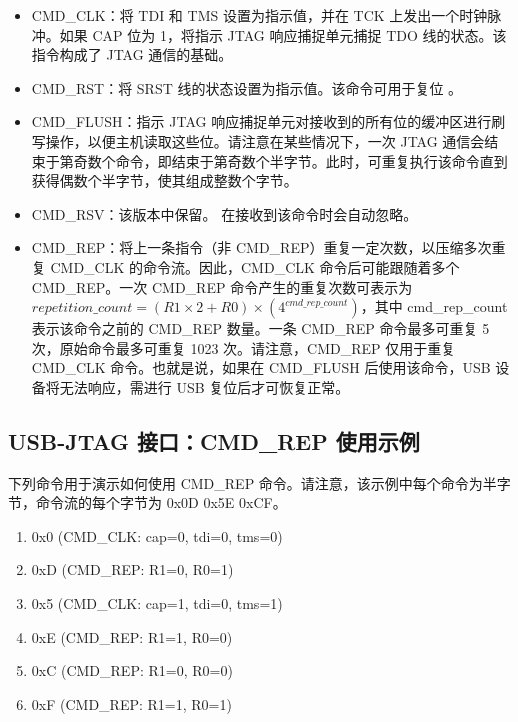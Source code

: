 \documentclass[main\_\_CN.tex]{subfiles}
\begin{document}
\begin{itemize}
\item CMD\_CLK：将 TDI 和 TMS 设置为指示值，并在 TCK 上发出一个时钟脉冲。如果 CAP 位为 1，将指示 JTAG 响应捕捉单元捕捉 TDO 线的状态。该指令构成了 JTAG 通信的基础。

\item CMD\_RST：将 SRST 线的状态设置为指示值。该命令可用于复位 \chipname{}。

\item CMD\_FLUSH：指示 JTAG 响应捕捉单元对接收到的所有位的缓冲区进行刷写操作，以便主机读取这些位。请注意在某些情况下，一次 JTAG 通信会结束于第奇数个命令，即结束于第奇数个半字节。此时，可重复执行该命令直到获得偶数个半字节，使其组成整数个字节。

\item CMD\_RSV：该版本中保留。\chipname{} 在接收到该命令时会自动忽略。

\item CMD\_REP：将上一条指令（非 CMD\_REP）重复一定次数，以压缩多次重复 CMD\_CLK 的命令流。因此，CMD\_CLK 命令后可能跟随着多个 CMD\_REP。一次 CMD\_REP 命令产生的重复次数可表示为 \begin{math}repetition\_count = (R1 \times 2 + R0) \times (4^{cmd\_rep\_count})\end{math}，其中 cmd\_rep\_count 表示该命令之前的 CMD\_REP 数量。一条 CMD\_REP 命令最多可重复 5 次，原始命令最多可重复 1023 次。请注意，CMD\_REP 仅用于重复 CMD\_CLK 命令。也就是说，如果在 CMD\_FLUSH 后使用该命令，USB 设备将无法响应，需进行 USB 复位后才可恢复正常。
\end{itemize}

\subsection{USB-JTAG 接口：CMD\_REP 使用示例}

下列命令用于演示如何使用 CMD\_REP 命令。请注意，该示例中每个命令为半字节，命令流的每个字节为 0x0D 0x5E 0xCF。

\begin{enumerate}
\item 0x0 (CMD\_CLK: cap=0, tdi=0, tms=0)
\item 0xD (CMD\_REP: R1=0, R0=1)
\item 0x5 (CMD\_CLK: cap=1, tdi=0, tms=1)
\item 0xE (CMD\_REP: R1=1, R0=0)
\item 0xC (CMD\_REP: R1=0, R0=0)
\item 0xF (CMD\_REP: R1=1, R0=1)
\end{enumerate}
\end{document}
